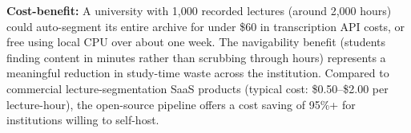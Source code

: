 \textbf{Cost-benefit:}
A university with 1{,}000 recorded lectures (around 2{,}000 hours) could
auto-segment its entire archive for under \$60 in transcription API costs, or
free using local CPU over about one week.
The navigability benefit (students finding content in minutes rather than
scrubbing through hours) represents a meaningful reduction in study-time
waste across the institution.
Compared to commercial lecture-segmentation SaaS products (typical cost:
\$0.50--\$2.00 per lecture-hour), the open-source \lecseg{} pipeline offers a
cost saving of 95\%+ for institutions willing to self-host.
